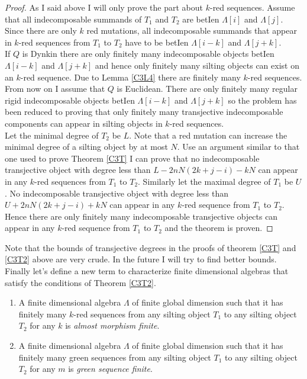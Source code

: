 \begin{proof}
\indent As I said above I will only prove the part about $k$-red sequences. Assume that all indecomposable summands of $T_1$ and $T_2$ are betIen $\Lambda[i]$ and $\Lambda[j]$. Since there are only $k$ red mutations, all indecomposable summands that appear in $k$-red sequences from $T_1$ to $T_2$ have to be betIen $\Lambda[i-k]$ and $\Lambda[j+k]$.\\ 
\indent If $Q$ is Dynkin there are only finitely many indecomposable objects betIen $\Lambda[i-k]$ and $\Lambda[j+k]$ and hence only finitely many silting objects can exist on an $k$-red sequence. Due to Lemma \ref{C3L4} there are finitely many $k$-red sequences. 
\indent From now on I assume that $Q$ is Euclidean. There are only finitely many regular rigid indecomposable objects betIen $\Lambda[i-k]$ and $\Lambda[j+k]$ so the problem has been reduced to proving that only finitely many transjective indecomposable components can appear in silting objects in $k$-red sequences.\\
\indent Let the minimal degree of $T_2$ be $L$. Note that a red mutation can increase the minimal degree of a silting object by at most $N$. Use an argument similar to that one used to prove Theorem \ref{C3T} I can prove that no indecomposable transjective object with degree less than $L-2nN(2k+j-i)-kN$ can appear in any $k$-red sequences from $T_1$ to $T_2$. Similarly let the maximal degree of $T_1$ be $U$. No indecomposable transjective object with degree less than $U+2nN(2k+j-i)+kN$ can appear in any $k$-red sequence from $T_1$ to $T_2$. Hence there are only finitely many indecomposable transjective objects can appear in any $k$-red sequence from $T_1$ to $T_2$ and the theorem is proven.
\end{proof}
\indent Note that the bounds of transjective degrees in the proofs of theorem \ref{C3T} and \ref{C3T2} above are very crude. In the future I will try to find better bounds.\\
\indent Finally let's define a new term to characterize finite dimensional algebras that satisfy the conditions of Theorem \ref{C3T2}.\\
\begin{definition}
\begin{enumerate}
\item A finite dimensional algebra $\Lambda$ of finite global dimension such that it has finitely many $k$-red sequences from any silting object $T_1$ to any silting object $T_2$ for any $k$ is \textit{almost morphism finite}.
\item A finite dimensional algebra $\Lambda$ of finite global dimension such that it has finitely many green sequences from any silting object $T_1$ to any silting object $T_2$ for any $m$ is \textit{green sequence finite}.
\end{enumerate}
\end{definition}
